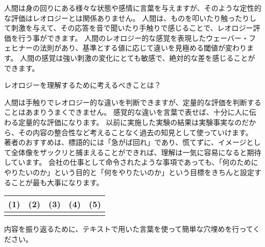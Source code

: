 \documentclass[uplatex,dvipdfmx,a4paper,11pt]{jsarticle}
\begin{document}
\begin{qlist}
\begin{qlist2}
            \qitem 人間は身の回りにある様々な状態や感情に言葉を与えますが、そのような定性的な評価はレオロジーとは関係ありません。
			\qitem 人間は、ものを叩いたり触ったりして刺激を与えて、その応答を音で聞いたり手触りで感じることで、レオロジー評価を行う事ができます。
			\qitem 人間のレオロジー的な感覚を表現したウェーバー・フェヒナーの法則があり、基準とする値に応じて違いを見極める閾値が変わります。
            \qitem 人間の感覚は強い刺激の変化にとても敏感で、絶対的な差を感じることができます。
    \end{qlist2}
    \vspace{3mm}
	\qitem レオロジーを理解するために考えるべきことは？
		\begin{qlist2}
			\qitem 人間は手触りでレオロジー的な違いを判断できますが、定量的な評価を判断することはあまりうまくできません。
            \qitem 感覚的な違いを言葉で表せば、十分に人に伝わる定量的な評価になります。
            \qitem 以前に実施した実験の結果は実験事実なのだから、その内容の整合性など考えることなく過去の知見として使っていけます。
			\qitem 著者のおすすめは、標語的には「急がば回れ」であり、慌てずに、イメージとして全体像をザックリと捕まえることができれば、理解は一気に容易になると期待しています。
			\qitem 会社の仕事として命令されたような事項であっても、「何のためにやりたいのか」という目的と「何をやりたいのか」という目標をきちんと設定することが最も大事になります。
		\end{qlist2}
\end{qlist}

\begin{table}[htb]
    \begin{center} 
      \begin{tabular}{|p{}|p{}|p{}|p{}|p{}|} \hline
        (1) & (2) & (3) & (4) & (5)\\ \hline \hline
          &  & & &  \\ \hline		
      \end{tabular}
    \end{center}
  \end{table}

\clearpage
{}
内容を振り返るために、テキストで用いた言葉を使って簡単な穴埋めを行ってください。
\end{document}
